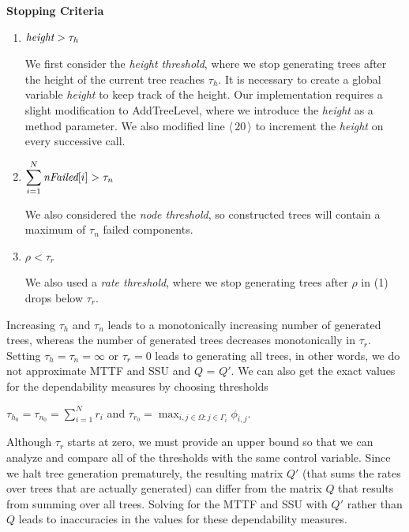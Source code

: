 \documentclass[12pt]{article}
\newcommand{\varName}[1]{\textrm{\it#1}}
\newcommand{\citeLine}[1]{$\langle \, #1 \, \rangle$}
\begin{document}
\vspace{1em}
\noindent\textbf{Stopping Criteria}
\begin{enumerate}
\item $\varName{height} > \tau_h$

We first consider the \textit{height threshold}, where we stop generating
trees after the height of the current tree reaches $\tau_h$. It is necessary
to create a global variable \varName{height} to keep track of the height.  Our
implementation requires a slight modification to \mbox{AddTreeLevel}, where we
introduce the \varName{height} as a method parameter. We also modified line
\citeLine{20} to increment the \varName{height} on every successive call.

\item $\displaystyle\sum_{i=1}^N \varName{nFailed}[i] > \tau_n$

We also considered the  \textit{node threshold}, so constructed trees will
contain a maximum of $\tau_n$ failed components.

\item $\rho < \tau_r$

We also used a \textit{rate threshold}, where we stop generating trees after
$\rho$ in (1) drops below $\tau_r$.
\end{enumerate}

Increasing $\tau_h$ and $\tau_n$ leads to a monotonically increasing number of
generated trees, whereas the number of generated trees decreases monotonically
in $\tau_r$. Setting $\tau_h = \tau_n = \infty$ or $\tau_r = 0$ leads to
generating all trees, in other words, we do not approximate MTTF and SSU and
$Q$ = $Q'$. We can also get the exact values for the dependability measures by
choosing thresholds

$\tau_{h_0} = \tau_{n_0} = \displaystyle\sum_{i=1}^N r_i$ and $\tau_{r_0} = 
\max_{i,j \in \Omega : j \in \Gamma_i} \phi_{i,j}$.

Although $\tau_r$ starts at zero, we must provide an upper bound so that we
can analyze and compare all of the thresholds with the same control variable.
Since we halt tree generation prematurely, the resulting matrix $Q'$ (that
sums the rates over trees that are actually generated) can differ from the
matrix $Q$ that results from summing over all trees. Solving for the MTTF and
SSU with $Q'$ rather than $Q$ leads to inaccuracies in the values for these
dependability measures.

\end{document}
